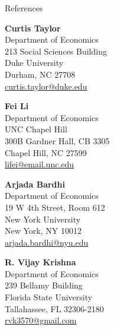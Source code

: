 \begin{rSection}{References}
	
	\medskip 
	\begin{center}
		\begin{minipage}{.31\linewidth}
			{\large \textbf{Curtis Taylor}}	\\[3pt]
			Department of Economics	\\		
			213 Social Sciences Building\\		
			Duke University\\		
			Durham, NC 27708\\[3pt]
			\href{mailto:curtis.taylor@duke.edu}{curtis.taylor@duke.edu}
		\end{minipage}
		\hspace*{80pt}
		\begin{minipage}{.31\linewidth}
			{\large \textbf{Fei Li}  }	\\[3pt]
			Department of Economics\\
			UNC Chapel Hill\\
			300B Gardner Hall, CB 3305\\
			Chapel Hill, NC 27599\\[3pt]
			\href{mailto:lifei@email.unc.edu}{lifei@email.unc.edu}
		\end{minipage}
		
		\vspace*{20pt}
		
		\begin{minipage}{.31\linewidth}
			{\large \textbf{Arjada Bardhi}}	\\[3pt]
			Department of Economics	\\		
			19 W 4th Street, Room 612\\		
			New York University\\		
			New York, NY 10012\\[3pt]
			\href{mailto:arjada.bardhi@nyu.edu}{arjada.bardhi@nyu.edu}
		\end{minipage}
		\hspace*{80pt}
		\begin{minipage}{.31\linewidth}
			{\large \textbf{R. Vijay Krishna}}	\\[3pt]
			Department of Economics	\\		
			239 Bellamy Building\\		
			Florida State University\\		
			Tallahassee, FL 32306-2180\\[3pt]
			\href{mailto:rvk3570@gmail.com}{rvk3570@gmail.com}
		\end{minipage}
	\end{center}
	
	
	
	
\end{rSection}
	

